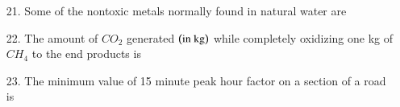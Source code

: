 \documentclass[journal,12pt,onecolumn]{IEEEtran}
\theoremstyle{remark}
\begin{document}
\begin{enumerate}
\begin{multicols}{4}
            \begin{enumerate}
                \item $\frac{L}{MT}$ 
                \item $\frac{L}{T^2}$ 
                \item $\frac{L^2}{T}$ 
                \item $\frac{ML}{T}$ 
            \end{enumerate}
        \end{multicols}

    \item[21.] Some of the nontoxic metals normally found in natural water are
        \hfill{}
        \begin{enumerate}
        \end{enumerate}


    \item[22.] The amount of $CO_2$ generated $\left(\textnormal{in kg}\right)$ while completely oxidizing
        one kg of $CH_4$ to the end products is 
        \hfill{}

    \item[23.] The minimum value of 15 minute peak hour factor on a section of a road is
        \hfill{}
        \begin{multicols}{4}


\end{multicols}
\end{enumerate}
\end{document}
